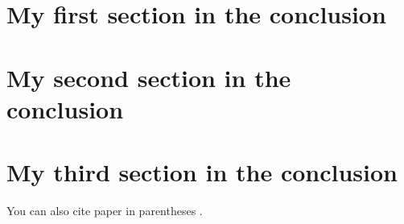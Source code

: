 
\section{My first section in the conclusion}%
\label{sec:my_first_section_in_the_conclusion}
\lipsum[1]

\section{My second section in the conclusion}%
\label{sec:my_second_section_in_the_conclusion}
\lipsum[2-4]

\section{My third section in the conclusion}%
\label{sec:my_third_section_in_the_conclusion}
\lipsum[2-4]
You can also cite paper in parentheses \parencite{ruda_first_2022,daby-seesaram_hybrid_2023}.
